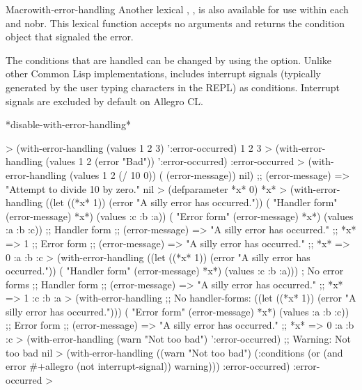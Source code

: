 \documentclass[10pt,twoside,english,pdftex]{article}
\begin{document}
\begin{functiondoc}{Macro}{with-error-handling}
Another lexical , , is also
available for use within each  and
nobr{}.  This lexical function accepts no arguments and
returns the condition object that signaled the error.

The conditions that are handled can be changed by using the
 option. Unlike other Common
Lisp implementations,  includes
interrupt signals (typically generated by the user typing
 characters in the REPL) as 
conditions.  Interrupt signals are excluded by default on Allegro CL.

\begin{alsos}{*disable-with-error-handling*}
\end{alsos}

%
\fnexamples
%
\W\supp
\begin{example}
  > (with-error-handling (values 1 2 3) ':error-occurred)
  1
  2
  3
  > (with-error-handling (values 1 2 (error "Bad")) ':error-occurred)
  :error-occurred
  > (with-error-handling (values 1 2 (/ 10 0)) ( (error-message)) nil)
  ;;  (error-message) => "Attempt to divide 10 by zero."
  nil\goodpagebreak
  > (defparameter *x* 0)
  *x*
  > (with-error-handling 
        ((let ((*x* 1))
           (error "A silly error has occurred."))
         ( "Handler form" (error-message) *x*)
         (values :c :b :a))
      ( "Error form" (error-message) *x*)
      (values :a :b :c))
  ;; Handler form
  ;;  (error-message) => "A silly error has occurred."
  ;;  *x* => 1
  ;; Error form
  ;;  (error-message) => "A silly error has occurred."
  ;;  *x* => 0
  :a
  :b
  :c\goodpagebreak
  > (with-error-handling 
        ((let ((*x* 1))
           (error "A silly error has occurred."))
         ( "Handler form" (error-message) *x*)
         (values :c :b :a)))          ; No error forms
  ;; Handler form
  ;;  (error-message) => "A silly error has occurred."
  ;;  *x* => 1
  :c
  :b
  :a\goodpagebreak
  > (with-error-handling 
        ;; No handler-forms:
        ((let ((*x* 1))
           (error "A silly error has occurred.")))
      ( "Error form" (error-message) *x*)
      (values :a :b :c))
  ;; Error form
  ;;  (error-message) => "A silly error has occurred."
  ;;  *x* => 0
  :a
  :b
  :c\goodpagebreak
  > (with-error-handling (warn "Not too bad") ':error-occurred)
  ;; Warning: Not too bad
  nil
  > (with-error-handling ((warn "Not too bad")
                          (:conditions (or (and error
                                                #+allegro
                                                (not interrupt-signal))
                                           warning))) 
      :error-occurred)
  :error-occurred
  >
\end{example}

\end{functiondoc}
\end{document}
